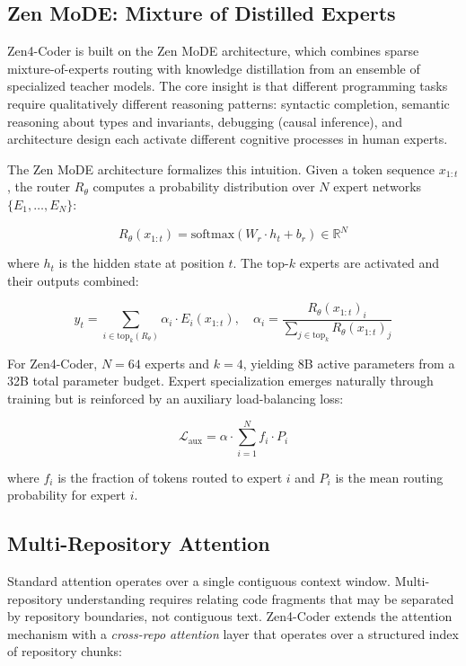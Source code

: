 \documentclass[11pt,a4paper]{article}
\begin{document}
\subsection{Zen MoDE: Mixture of Distilled Experts}

Zen4-Coder is built on the Zen MoDE architecture, which combines sparse mixture-of-experts routing with knowledge distillation from an ensemble of specialized teacher models. The core insight is that different programming tasks require qualitatively different reasoning patterns: syntactic completion, semantic reasoning about types and invariants, debugging (causal inference), and architecture design each activate different cognitive processes in human experts.

The Zen MoDE architecture formalizes this intuition. Given a token sequence $x_{1:t}$, the router $R_\theta$ computes a probability distribution over $N$ expert networks $\{E_1, \ldots, E_N\}$:

\begin{equation}
  R_\theta(x_{1:t}) = \text{softmax}\left(W_r \cdot h_t + b_r\right) \in \mathbb{R}^N
\end{equation}

where $h_t$ is the hidden state at position $t$. The top-$k$ experts are activated and their outputs combined:

\begin{equation}
  y_t = \sum_{i \in \text{top}_k(R_\theta)} \alpha_i \cdot E_i(x_{1:t}), \quad \alpha_i = \frac{R_\theta(x_{1:t})_i}{\sum_{j \in \text{top}_k} R_\theta(x_{1:t})_j}
\end{equation}

For Zen4-Coder, $N = 64$ experts and $k = 4$, yielding 8B active parameters from a 32B total parameter budget. Expert specialization emerges naturally through training but is reinforced by an auxiliary load-balancing loss:

\begin{equation}
  \mathcal{L}_{\text{aux}} = \alpha \cdot \sum_{i=1}^{N} f_i \cdot P_i
\end{equation}

where $f_i$ is the fraction of tokens routed to expert $i$ and $P_i$ is the mean routing probability for expert $i$.

\subsection{Multi-Repository Attention}

Standard attention operates over a single contiguous context window. Multi-repository understanding requires relating code fragments that may be separated by repository boundaries, not contiguous text. Zen4-Coder extends the attention mechanism with a \emph{cross-repo attention} layer that operates over a structured index of repository chunks:
\end{document}
